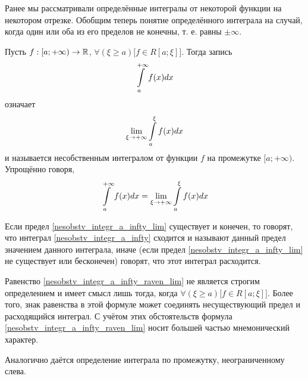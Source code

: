 Ранее мы рассматривали определённые интегралы от некоторой функции на некотором отрезке.
Обобщим теперь понятие определённого интеграла на случай, когда один или оба из его пределов не конечны, т. е. равны $\pm\infty$.

\begin{opr}
Пусть $f:[a;+\infty)\to\mathbb{R}$, $\forall(\xi\geq a)\bigl[f\in R[a;\xi]\bigr]$.
Тогда запись
\begin{equation}\label{nesobstv_integr_a_infty}
\int\limits_a^{+\infty} f(x) dx
\end{equation}
означает 
\begin{equation}\label{nesobstv_integr_a_infty_lim}
\lim_{\xi\to+\infty} \int\limits_a^\xi f(x) dx
\end{equation}
и называется несобственным интегралом от функции $f$ на промежутке $[a;+\infty)$.
Упрощённо говоря,
\begin{equation}\label{nesobstv_integr_a_infty_raven_lim}
\int\limits_a^{+\infty} f(x) dx
=
\lim_{\xi\to+\infty} \int\limits_a^\xi f(x) dx
\end{equation}
\end{opr}
\begin{opr}
Если предел \ref{nesobstv_integr_a_infty_lim} существует и конечен, то говорят, что интеграл \ref{nesobstv_integr_a_infty} сходится и называют данный предел значением данного интеграла, иначе (если предел \ref{nesobstv_integr_a_infty_lim} не существует или бесконечен) говорят, что этот интеграл расходится.
\end{opr}
\begin{zamech}
Равенство \ref{nesobstv_integr_a_infty_raven_lim} не является строгим определением и имеет смысл лишь тогда, когда $\forall(\xi\geq a)\bigl[f\in R[a;\xi]\bigr]$.
Более того, знак равенства в этой формуле может соединять несуществующий предел и расходящийся интеграл.
С учётом этих обстоятельств формула \ref{nesobstv_integr_a_infty_raven_lim} носит большей частью мнемонический характер.
\end{zamech}
Аналогично даётся определение интеграла по промежутку, неограниченному слева.


